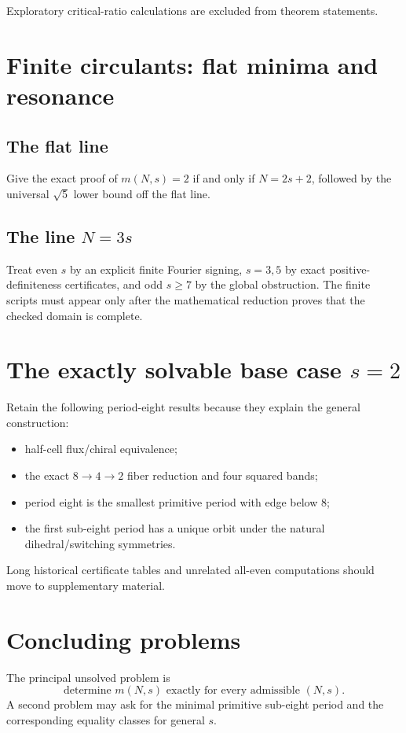 \documentclass[11pt]{article}
\theoremstyle{remark}
\begin{document}
Exploratory critical-ratio calculations are excluded from theorem statements.

\section{Finite circulants: flat minima and resonance}

\subsection{The flat line}
Give the exact proof of $m(N,s)=2$ if and only if $N=2s+2$, followed by the
universal $\sqrt5$ lower bound off the flat line.

\subsection{The line $N=3s$}
Treat even $s$ by an explicit finite Fourier signing, $s=3,5$ by exact
positive-definiteness certificates, and odd $s\ge7$ by the global obstruction.
The finite scripts must appear only after the mathematical reduction proves
that the checked domain is complete.

\section{The exactly solvable base case $s=2$}

Retain the following period-eight results because they explain the general
construction:

\begin{itemize}
  \item half-cell flux/chiral equivalence;
  \item the exact $8\to4\to2$ fiber reduction and four squared bands;
  \item period eight is the smallest primitive period with edge below $8$;
  \item the first sub-eight period has a unique orbit under the natural
        dihedral/switching symmetries.
\end{itemize}

Long historical certificate tables and unrelated all-even computations should
move to supplementary material.

\section{Concluding problems}

The principal unsolved problem is
\[
 \boxed{\text{determine }m(N,s)\text{ exactly for every admissible }(N,s).}
\]
A second problem may ask for the minimal primitive sub-eight period and the
corresponding equality classes for general $s$.
\end{document}
